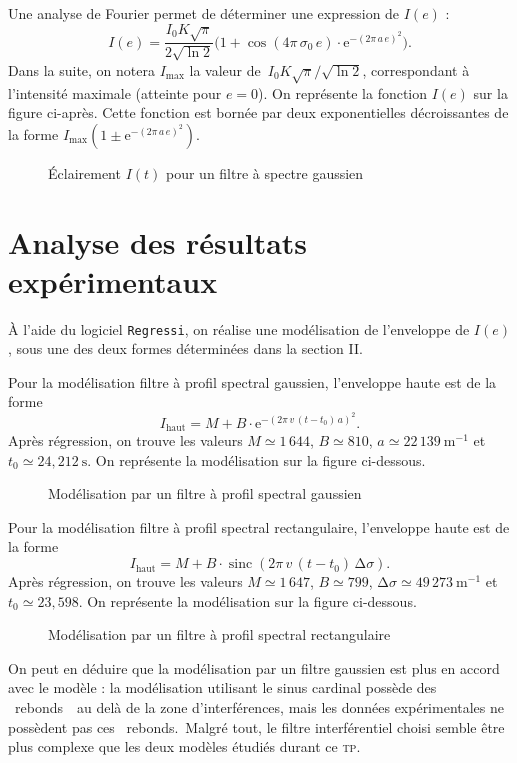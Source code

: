 \documentclass[a4paper,twocolumn,10pt,margin=0.5in]{extreport}
\begin{document}
	Une analyse de Fourier permet de déterminer une expression de $I(e)$ : \[
		I(e) = \frac{I_0K\sqrt{\pi}}{2\sqrt{\ln 2}} \big(1 + \cos(4\pi\,\sigma_0\,e) \cdot \mathrm{e}^{-(2\pi\,a\,e)^2}\big)
	.\]
	Dans la suite, on notera $I_{\max}$ la valeur de~$I_0K \sqrt{\pi} / \sqrt{\ln 2}$, correspondant à l'intensité maximale (atteinte pour $e = 0$).
	On représente la fonction $I(e)$ sur la figure ci-après.
	Cette fonction est bornée par deux exponentielles décroissantes de la forme $I_{\max} (1 \pm \mathrm{e}^{-(2\pi\,a\,e)^2})$.

	\begin{figure}[H]
		\centering
		\resizebox{\linewidth}{!}{}
		\caption{Éclairement $I(t)$ pour un filtre à spectre gaussien}
	\end{figure}

	\section{Analyse des résultats expérimentaux}

	À l'aide du logiciel \texttt{Regressi}, on réalise une modélisation de l'enveloppe de $I(e)$, sous une des deux formes déterminées dans la section II.

	Pour la modélisation filtre à profil spectral gaussien, l'enveloppe haute est de la forme \[
		I_\mathrm{haut} = M + B \cdot \mathrm{e}^{-(2\pi\,v\,(t-t_0)\,a)^2}
	.\] Après régression, on trouve les valeurs $M \simeq 1\,644$, $B \simeq 810$, $a\simeq 22\,139\:\mathrm{m}^{-1}$ et $t_0 \simeq 24{,}212\:\mathrm{s}$.
	On représente la modélisation sur la figure ci-dessous.

	\begin{figure}[H]
		\centering
		\resizebox{\linewidth}{!}{}
		\caption{Modélisation par un filtre à profil spectral gaussien}
	\end{figure}

	Pour la modélisation filtre à profil spectral rectangulaire, l'enveloppe haute est de la forme \[
		I_\mathrm{haut} = M + B \cdot \operatorname{sinc}(2\pi\,v\,(t-t_0)\,\mathrm{\Delta}\sigma)
	.\] Après régression, on trouve les valeurs $M \simeq 1\,647$, $B\simeq 799$, $\mathrm{\Delta}\sigma \simeq 49\,273\:\mathrm{m}^{-1}$ et $t_0 \simeq 23{,}598$.
	On représente la modélisation sur la figure ci-dessous.

	\begin{figure}[H]
		\centering
		\resizebox{\linewidth}{!}{}
		\caption{Modélisation par un filtre à profil spectral rectangulaire}
	\end{figure}

	On peut en déduire que la modélisation par un filtre gaussien est plus en accord avec le modèle : la modélisation utilisant le sinus cardinal possède des \guillemotleft~rebonds~\guillemotright\ au delà de la zone d'interférences, mais les données expérimentales ne possèdent pas ces \guillemotleft~rebonds.~\guillemotright\@ Malgré tout, le filtre interférentiel choisi semble être plus complexe que les deux modèles étudiés durant ce \textsc{tp}.

	\sign

	~
\end{document}
